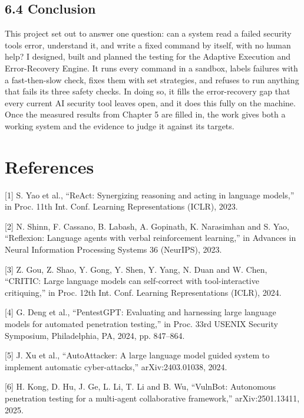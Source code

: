 \documentclass[
]{article}
\begin{document}
\hypertarget{conclusion}{%
\subsection{6.4 Conclusion}\label{conclusion}}

This project set out to answer one question: can a system read a failed
security tool\textquotesingle s error, understand it, and write a fixed
command by itself, with no human help? I designed, built and planned the
testing for the Adaptive Execution and Error-Recovery Engine. It runs
every command in a sandbox, labels failures with a fast-then-slow check,
fixes them with set strategies, and refuses to run anything that fails
its three safety checks. In doing so, it fills the error-recovery gap
that every current AI security tool leaves open, and it does this fully
on the machine. Once the measured results from Chapter 5 are filled in,
the work gives both a working system and the evidence to judge it
against its targets.

\hypertarget{references}{%
\section{References}\label{references}}

{[}1{]} S. Yao et al., ``ReAct: Synergizing reasoning and acting in
language models,'' in Proc. 11th Int. Conf. Learning Representations
(ICLR), 2023.

{[}2{]} N. Shinn, F. Cassano, B. Labash, A. Gopinath, K. Narasimhan and
S. Yao, ``Reflexion: Language agents with verbal reinforcement
learning,'' in Advances in Neural Information Processing Systems 36
(NeurIPS), 2023.

{[}3{]} Z. Gou, Z. Shao, Y. Gong, Y. Shen, Y. Yang, N. Duan and W. Chen,
``CRITIC: Large language models can self-correct with tool-interactive
critiquing,'' in Proc. 12th Int. Conf. Learning Representations (ICLR),
2024.

{[}4{]} G. Deng et al., ``PentestGPT: Evaluating and harnessing large
language models for automated penetration testing,'' in Proc. 33rd
USENIX Security Symposium, Philadelphia, PA, 2024, pp. 847--864.

{[}5{]} J. Xu et al., ``AutoAttacker: A large language model guided
system to implement automatic cyber-attacks,'' arXiv:2403.01038, 2024.

{[}6{]} H. Kong, D. Hu, J. Ge, L. Li, T. Li and B. Wu, ``VulnBot:
Autonomous penetration testing for a multi-agent collaborative
framework,'' arXiv:2501.13411, 2025.
\end{document}
